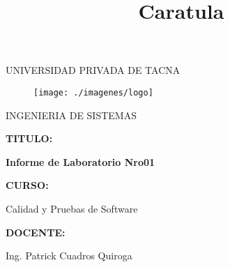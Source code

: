 \documentclass[12pt,letterpaper]{article}
\begin{document}
%


\title{Caratula}

\begin{titlepage}
\begin{center}
\large{UNIVERSIDAD PRIVADA DE TACNA}\\
\vspace*{-0.025in}
\begin{figure}[htb]
\begin{center}
\texttt{[image: ./imagenes/logo]}
\end{center}
\end{figure}
\vspace*{0.15in}
INGENIERIA DE SISTEMAS  \\

\vspace*{0.3in}
\begin{large}
\textbf{TITULO:} \\
\end{large}

\vspace*{0.1in}
\begin{Large}
\textbf{Informe de Laboratorio Nro01} \\

\end{Large}

\vspace*{0.3in}
\begin{Large}
\textbf{CURSO:} \\
\end{Large}

\vspace*{0.1in}
\begin{large}
Calidad y Pruebas de Software\\
\end{large}

\vspace*{0.3in}
\begin{Large}
\textbf{DOCENTE:} \\
\end{Large}

\vspace*{0.1in}
\begin{large}
 Ing. Patrick Cuadros Quiroga\\
\end{large}


\end{center}
\end{titlepage}
\end{document}

